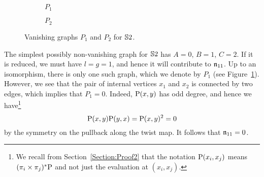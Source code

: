 \documentclass[\MainFolder/Text.tex]{subfiles}
\begin{document}
\begin{Remark}\label{Rem:GraphsTwoSphere}

{ \begingroup
\begin{figure}
\centering
\begin{subfigure}{0.45\textwidth}
\centering

\caption{$P_1$}
\end{subfigure}
\begin{subfigure}{0.45\textwidth}
\centering

\caption{$P_2$}
\end{subfigure}
\caption{Vanishing graphs $P_1$ and $P_2$ for $\mathbb{S}{2}$.}\label{Fig:P1P2}
\end{figure}
\endgroup }
The simplest possibly non-vanishing graph for $\mathbb{S}{2}$ has $A= 0$, $B=1$, $C=2$. If it is reduced, we must have $l = g = 1$, and hence it will contribute to $\mathfrak{n}_{11}$. Up to an isomorphism, there is only one such graph, which we denote by $P_1$ (see Figure~\ref{Fig:P1P2}). However, we see that the pair of internal vertices $x_1$ and $x_2$ is connected by two edges, which implies that $P_1 =0$. Indeed, $\mathrm{P}(x,y)$ has odd degree, and hence we have\footnote{We recall from Section~\ref{Section:Proof2} that the notation $\mathrm{P}(x_i,x_j)$ means $(\pi_{i} \times \pi_j)^* \mathrm{P}$ and not just the evaluation at $(x_i,x_j)$.}
\[ \mathrm{P}(x,y)\mathrm{P}(y,x) = \mathrm{P}(x,y)^2 = 0 \]
by the symmetry on the pullback along the twist map. It follows that $\mathfrak{n}_{11} = 0$.


\end{Remark}
\end{document}
